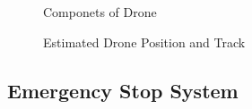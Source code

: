 \documentclass[lettersize,journal]{IEEEtran}
\begin{document}
\begin{figure}[H]
  \begin{center}
  \end{center}
  \caption{Componets of Drone}
  \label{fig:drone}
\end{figure}

\begin{figure}[H]
  \begin{center}
  \end{center}
  \caption{Estimated Drone Position and Track}
  \label{fig:drone_posi}
\end{figure}

\subsection{Emergency Stop System}
\end{document}

